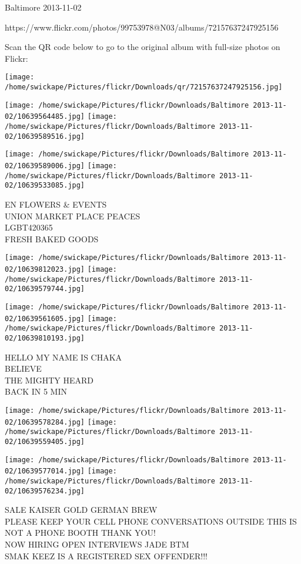 \documentclass[10pt,letterpaper]{article}
\begin{document}
Baltimore 2013-11-02

https://www.flickr.com/photos/99753978@N03/albums/72157637247925156

Scan the QR code below to go to the original album with full-size photos on Flickr:

\texttt{[image: /home/swickape/Pictures/flickr/Downloads/qr/72157637247925156.jpg]}
\pagebreak

\texttt{[image: /home/swickape/Pictures/flickr/Downloads/Baltimore 2013-11-02/10639564485.jpg]}
\texttt{[image: /home/swickape/Pictures/flickr/Downloads/Baltimore 2013-11-02/10639589516.jpg]}

\texttt{[image: /home/swickape/Pictures/flickr/Downloads/Baltimore 2013-11-02/10639589006.jpg]}
\texttt{[image: /home/swickape/Pictures/flickr/Downloads/Baltimore 2013-11-02/10639533085.jpg]}

EN FLOWERS \& EVENTS\\
UNION MARKET PLACE PEACES\\
LGBT420365\\
FRESH BAKED GOODS
\pagebreak

\texttt{[image: /home/swickape/Pictures/flickr/Downloads/Baltimore 2013-11-02/10639812023.jpg]}
\texttt{[image: /home/swickape/Pictures/flickr/Downloads/Baltimore 2013-11-02/10639579744.jpg]}

\texttt{[image: /home/swickape/Pictures/flickr/Downloads/Baltimore 2013-11-02/10639561605.jpg]}
\texttt{[image: /home/swickape/Pictures/flickr/Downloads/Baltimore 2013-11-02/10639810193.jpg]}

HELLO MY NAME IS CHAKA\\
BELIEVE\\
THE MIGHTY HEARD\\
BACK IN 5 MIN
\pagebreak

\texttt{[image: /home/swickape/Pictures/flickr/Downloads/Baltimore 2013-11-02/10639578284.jpg]}
\texttt{[image: /home/swickape/Pictures/flickr/Downloads/Baltimore 2013-11-02/10639559405.jpg]}

\texttt{[image: /home/swickape/Pictures/flickr/Downloads/Baltimore 2013-11-02/10639577014.jpg]}
\texttt{[image: /home/swickape/Pictures/flickr/Downloads/Baltimore 2013-11-02/10639576234.jpg]}

SALE KAISER GOLD GERMAN BREW\\
PLEASE KEEP YOUR CELL PHONE CONVERSATIONS OUTSIDE THIS IS NOT A PHONE BOOTH THANK YOU!\\
NOW HIRING OPEN INTERVIEWS JADE BTM\\
SMAK KEEZ IS A REGISTERED SEX OFFENDER!!!
\pagebreak
\end{document}
